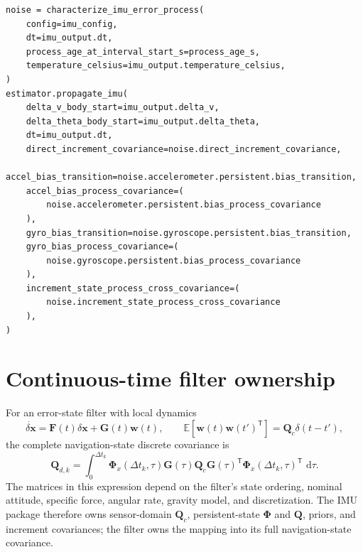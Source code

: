 \documentclass[11pt,oneside,headings=big]{scrreprt}
\newcommand{\E}{\mathbb{E}}
\newcommand{\dd}{\,\mathrm{d}}
\newcommand{\transpose}{\mathsf{T}}
\newcommand{\vect}[1]{\bm{#1}}
\newcommand{\mat}[1]{\bm{#1}}
\begin{document}
    \begin{lstlisting}[style=imuPython,caption={Augmented-filter use of sensor-domain statistics.},label={lst:characterization-filter}]
noise = characterize_imu_error_process(
    config=imu_config,
    dt=imu_output.dt,
    process_age_at_interval_start_s=process_age_s,
    temperature_celsius=imu_output.temperature_celsius,
)
estimator.propagate_imu(
    delta_v_body_start=imu_output.delta_v,
    delta_theta_body_start=imu_output.delta_theta,
    dt=imu_output.dt,
    direct_increment_covariance=noise.direct_increment_covariance,
    accel_bias_transition=noise.accelerometer.persistent.bias_transition,
    accel_bias_process_covariance=(
        noise.accelerometer.persistent.bias_process_covariance
    ),
    gyro_bias_transition=noise.gyroscope.persistent.bias_transition,
    gyro_bias_process_covariance=(
        noise.gyroscope.persistent.bias_process_covariance
    ),
    increment_state_process_cross_covariance=(
        noise.increment_state_process_cross_covariance
    ),
)
    \end{lstlisting}


    \section{Continuous-time filter ownership}
    For an error-state filter with local dynamics
    \begin{equation}
        \dot{\delta\vect x}
        =\mat F(t)\delta\vect x+\mat G(t)\vect w(t),
        \qquad
        \E[\vect w(t)\vect w(t')^\transpose]
        =\mat Q_c\delta(t-t'),
        \label{eq:characterization-filter-dynamics}
    \end{equation}
    the complete navigation-state discrete covariance is
    \begin{equation}
        \mat Q_{d,k}
        =\int_0^{\Delta t_k}
        \mat\Phi_x(\Delta t_k,\tau)\mat G(\tau)\mat Q_c
        \mat G(\tau)^\transpose
        \mat\Phi_x(\Delta t_k,\tau)^\transpose\,\dd\tau.
        \label{eq:characterization-filter-covariance}
    \end{equation}
    The matrices in this expression depend on the filter's state ordering, nominal
    attitude, specific force, angular rate, gravity model, and discretization. The
    IMU package therefore owns sensor-domain $\mat Q_c$, persistent-state
    $\mat\Phi$ and $\mat Q$, priors, and increment covariances; the filter owns
    the mapping into its full navigation-state covariance.
\end{document}
